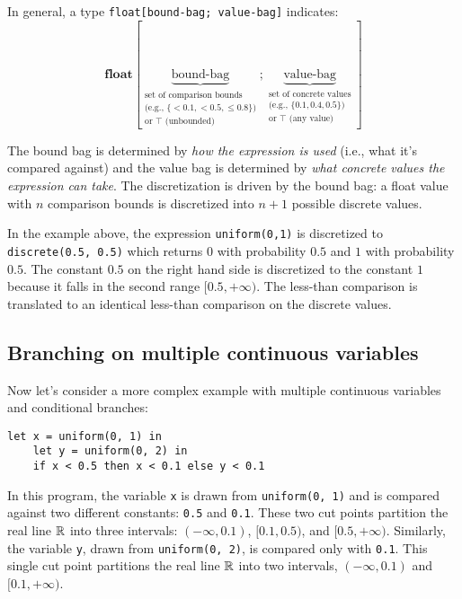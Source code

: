 \documentclass[acmsmall,screen,dvipsnames,x11names,nonacm,anonymous,review]{acmart}
\begin{document}
In general, a type \lstinline{float[bound-bag; value-bag]} indicates:
\[
\textbf{float}
[
\underbrace{\text{bound-bag}}_{\begin{array}{c}\text{set of comparison bounds}\\\text{(e.g., }\{<\!0.1, <\!0.5, \leq\!0.8\}\text{)}\\\text{or }\top\text{ (unbounded)}\end{array}}
;
\underbrace{\text{value-bag}}_{\begin{array}{c}\text{set of concrete values}\\\text{(e.g., }\{0.1, 0.4, 0.5\}\text{)}\\\text{or }\top\text{ (any value)}\end{array}}
]
\]

The bound bag is determined by \emph{how the expression is used} (i.e., what it's compared against) and the value bag is determined by \emph{what concrete values the expression can take}.
The discretization is driven by the bound bag: a float value with $n$ comparison bounds is discretized into $n+1$ possible discrete values.

In the example above, the expression \lstinline{uniform(0,1)} is discretized to \lstinline{discrete(0.5, 0.5)} which returns $0$ with probability $0.5$ and $1$ with probability $0.5$.
The constant $0.5$ on the right hand side is discretized to the constant $1$ because it falls in the second range $[0.5, +\infty)$. The less-than comparison is translated to an identical less-than comparison on the discrete values.

\subsection{Branching on multiple continuous variables}

\noindent Now let's consider a more complex example with multiple continuous variables and conditional branches:

\begin{lstlisting}[aboveskip=1em,belowskip=1em]
    let x = uniform(0, 1) in
    let y = uniform(0, 2) in
    if x < 0.5 then x < 0.1 else y < 0.1
\end{lstlisting}

\noindent In this program, the variable \texttt{x} is drawn from \texttt{uniform(0, 1)} and is compared against two different constants: \texttt{0.5} and \texttt{0.1}. These two cut points partition the real line $\mathbb{R}$ into three intervals: $(-\infty, 0.1)$, $[0.1, 0.5)$, and $[0.5, +\infty)$. Similarly, the variable \texttt{y}, drawn from \texttt{uniform(0, 2)}, is compared only with \texttt{0.1}. This single cut point partitions the real line $\mathbb{R}$ into two intervals, $(-\infty, 0.1)$ and $[0.1, +\infty)$.
\end{document}
